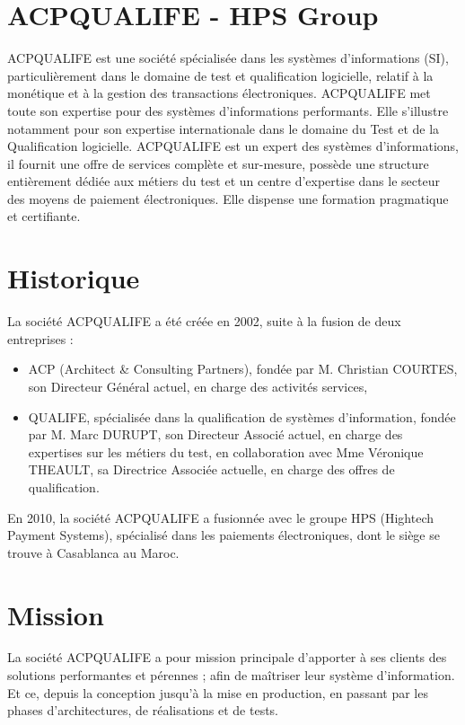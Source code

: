 \section{ACPQUALIFE - HPS Group}

ACPQUALIFE est une société spécialisée dans les systèmes d'informations (SI), particulièrement dans le domaine de test et qualification logicielle, relatif à la monétique et à la gestion des transactions électroniques. ACPQUALIFE met toute son expertise pour des systèmes d'informations performants. Elle s'illustre notamment pour son expertise internationale dans le domaine du Test et de la Qualification logicielle. ACPQUALIFE est un expert des systèmes d'informations, il fournit une offre de services complète et sur-mesure, possède une structure entièrement dédiée aux métiers du test et un centre d'expertise dans le secteur des moyens de paiement électroniques. Elle dispense une formation pragmatique et certifiante.

\section{Historique}

La société ACPQUALIFE a été créée en 2002, suite à la fusion de deux entreprises :
\begin{itemize}[leftmargin=*]
\item ACP (Architect \& Consulting Partners), fondée par M. Christian COURTES, son Directeur Général actuel, en charge des activités services,
\item QUALIFE, spécialisée dans la qualification de systèmes d'information, fondée par M. Marc DURUPT, son Directeur Associé actuel, en charge des expertises sur les métiers du test, en collaboration avec Mme Véronique THEAULT, sa Directrice Associée actuelle, en charge des offres de qualification.
\end{itemize}

En 2010, la société ACPQUALIFE a fusionnée avec le groupe HPS (Hightech Payment Systems), spécialisé dans les paiements électroniques, dont le siège se trouve à Casablanca au Maroc.

\section{Mission}

La société ACPQUALIFE a pour mission principale d'apporter à ses clients des solutions performantes et pérennes ; afin de maîtriser leur système d'information. Et ce, depuis la conception jusqu'à la mise en production, en passant par les phases d'architectures, de réalisations et de tests.

